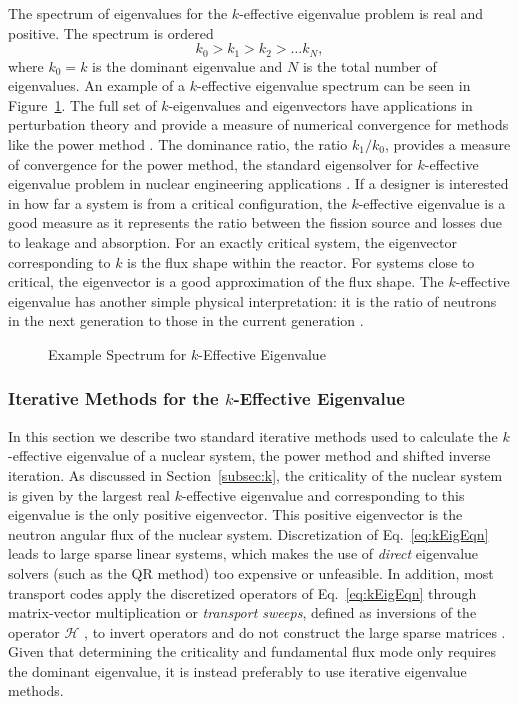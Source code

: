 The spectrum of eigenvalues for the $k$-effective eigenvalue problem is real and positive. The spectrum is ordered
\begin{equation}
	k_{0} > k_{1} > k_{2} > \dots k_{N},
\end{equation}
where $k_{0} = k$ is the dominant eigenvalue and $N$ is the total number of eigenvalues. An example of a $k$-effective eigenvalue spectrum can be seen in Figure~\ref{fig:keffspec}. The full set of $k$-eigenvalues and eigenvectors have applications in perturbation theory and provide a measure of numerical convergence for methods like the power method \cite{lewis_computational_1984}. The dominance ratio, the ratio $k_{1}/k_{0}$, provides a measure of convergence for the power method, the standard eigensolver for $k$-effective eigenvalue problem in nuclear engineering applications \cite{lewis_computational_1984}. If a designer is interested in how far a system is from a critical configuration, the $k$-effective eigenvalue is a good measure as it represents the ratio between the fission source and losses due to leakage and absorption. For an exactly critical system, the eigenvector corresponding to $k$ is the flux shape within the reactor. For systems close to critical, the eigenvector is a good approximation of the flux shape. The $k$-effective eigenvalue has another simple physical interpretation: it is the ratio of neutrons in the next generation to those in the current generation \cite{ronen_comparison_1976}.

\begin{figure}
	\centering
	\resizebox{0.5\textwidth}{!}{
	
	}
	\caption{Example Spectrum for $k$-Effective Eigenvalue}
	\label{fig:keffspec}
\end{figure}

\subsubsection{Iterative Methods for the $k$-Effective Eigenvalue}

In this section we describe two standard iterative methods used to calculate the $k$-effective eigenvalue of a nuclear system, the power method and shifted inverse iteration. As discussed in Section~\ref{subsec:k}, the criticality of the nuclear system is given by the largest real $k$-effective eigenvalue and corresponding to this eigenvalue is the only positive eigenvector. This positive eigenvector is the neutron angular flux of the nuclear system. Discretization of Eq.~\ref{eq:kEigEqn} leads to large sparse linear systems, which makes the use of \textit{direct} eigenvalue solvers (such as the QR method) too expensive or unfeasible. In addition, most transport codes apply the discretized operators of Eq.~\ref{eq:kEigEqn} through matrix-vector multiplication or \textit{transport sweeps}, defined as inversions of the operator $\mathcal{H}$ \cite{willert_comparison_2014}, to invert operators and do not construct the large sparse matrices \cite{lewis_computational_1984}. Given that determining the criticality and fundamental flux mode only requires the dominant eigenvalue, it is instead preferably to use iterative eigenvalue methods.

